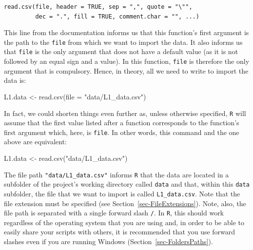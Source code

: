 \documentclass[
  letterpaper,
  DIV=11,
  numbers=noendperiod]{scrreprt}
\newenvironment{Shaded}{\begin{snugshade}}{\end{snugshade}}
\newcommand{\AttributeTok}[1]{\textcolor[rgb]{0.40,0.45,0.13}{#1}}
\newcommand{\FunctionTok}[1]{\textcolor[rgb]{0.28,0.35,0.67}{#1}}
\newcommand{\NormalTok}[1]{\textcolor[rgb]{0.00,0.23,0.31}{#1}}
\newcommand{\OtherTok}[1]{\textcolor[rgb]{0.00,0.23,0.31}{#1}}
\newcommand{\StringTok}[1]{\textcolor[rgb]{0.13,0.47,0.30}{#1}}
\begin{document}
\begin{verbatim}
read.csv(file, header = TRUE, sep = ",", quote = "\"",
         dec = ".", fill = TRUE, comment.char = "", ...)
\end{verbatim}

This line from the documentation informs us that this function's first
argument is the path to the \texttt{file} from which we want to import
the data. It also informs us that \texttt{file} is the only argument
that does not have a default value (as it is not followed by an equal
sign and a value). In this function, \texttt{file} is therefore the only
argument that is compulsory. Hence, in theory, all we need to write to
import the data is:

\begin{Shaded}
\begin{Highlighting}[]
\NormalTok{L1.data }\OtherTok{\textless{}{-}} \FunctionTok{read.csv}\NormalTok{(}\AttributeTok{file =} \StringTok{"data/L1\_data.csv"}\NormalTok{)}
\end{Highlighting}
\end{Shaded}

In fact, we could shorten things even further as, unless otherwise
specified, \texttt{R} will assume that the first value listed after a
function corresponds to the function's first argument which, here, is
\texttt{file}. In other words, this command and the one above are
equivalent:

\begin{Shaded}
\begin{Highlighting}[]
\NormalTok{L1.data }\OtherTok{\textless{}{-}} \FunctionTok{read.csv}\NormalTok{(}\StringTok{"data/L1\_data.csv"}\NormalTok{)}
\end{Highlighting}
\end{Shaded}

The file path \texttt{"data/L1\_data.csv"} informs \texttt{R} that the
data are located in a subfolder of the project's working directory
called \texttt{data} and that, within this \texttt{data} subfolder, the
file that we want to import is called \texttt{L1\_data.csv}. Note that
the file extension must be specified (see
Section~\ref{sec-FileExtensions}). Note, also, the file path is
separated with a single forward slash \texttt{/}. In \texttt{R}, this
should work regardless of the operating system that you are using and,
in order to be able to easily share your scripts with others, it is
recommended that you use forward slashes even if you are running Windows
(Section~\ref{sec-FoldersPaths}).
\end{document}
